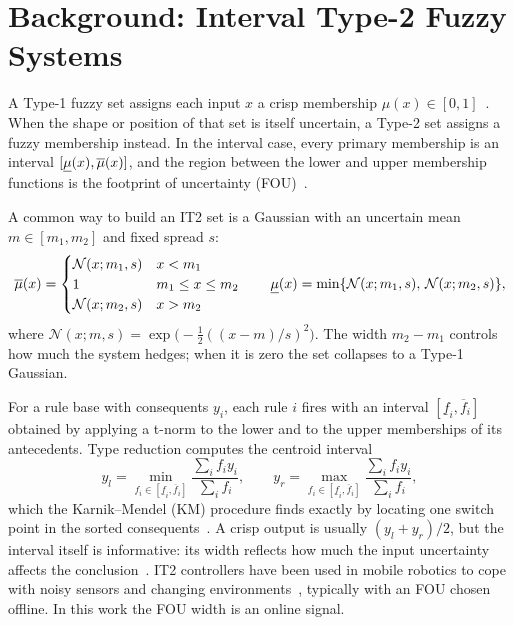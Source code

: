 \section{Background: Interval Type-2 Fuzzy Systems}
\label{sec:background}

A Type-1 fuzzy set assigns each input $x$ a crisp membership
$\mu(x)\in[0,1]$~\cite{zadeh1975linguistic}. When the shape or position of
that set is itself uncertain, a Type-2 set assigns a fuzzy membership
instead. In the interval case, every primary membership is an interval
$[\underline{\mu}(x),\overline{\mu}(x)]$, and the region between the lower and upper membership
functions is the footprint of uncertainty
(FOU)~\cite{liang2000it2,mendel2006it2simple}.

A common way to build an IT2 set is a Gaussian with an uncertain mean
$m\in[m_1,m_2]$ and fixed spread $s$:
\begin{equation}
\overline{\mu}(x)=
\begin{cases}
\mathcal{N}(x;m_1,s) & x<m_1\\
1 & m_1\le x\le m_2\\
\mathcal{N}(x;m_2,s) & x>m_2
\end{cases}
\qquad
\underline{\mu}(x)=\min\{\mathcal{N}(x;m_1,s),\,\mathcal{N}(x;m_2,s)\},
\label{eq:um-gauss}
\end{equation}
where $\mathcal{N}(x;m,s)=\exp\!\big(-\tfrac12((x-m)/s)^2\big)$. The width
$m_2-m_1$ controls how much the system hedges; when it is zero the set
collapses to a Type-1 Gaussian.

For a rule base with consequents $y_i$, each rule $i$ fires with an interval
$[\underline{f}_i,\overline{f}_i]$ obtained by applying a t-norm to the lower
and to the upper memberships of its antecedents. Type reduction computes the
centroid interval
\begin{equation}
y_l=\min_{f_i\in[\underline{f}_i,\overline{f}_i]}
  \frac{\sum_i f_i y_i}{\sum_i f_i},\qquad
y_r=\max_{f_i\in[\underline{f}_i,\overline{f}_i]}
  \frac{\sum_i f_i y_i}{\sum_i f_i},
\label{eq:km}
\end{equation}
which the Karnik--Mendel (KM) procedure finds exactly by locating one switch
point in the sorted consequents~\cite{karnik2001centroid}. A crisp output is
usually $(y_l+y_r)/2$, but the interval itself is informative: its width
reflects how much the input uncertainty affects the conclusion~\cite{wu2002bounds}.
IT2 controllers have been used in mobile robotics to cope with noisy
sensors and changing environments~\cite{hagras2004hierarchical}, typically
with an FOU chosen offline. In this work the FOU width is an online signal.

